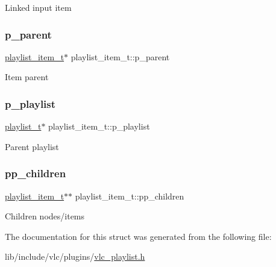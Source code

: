 Linked input item \mbox{\label{structplaylist__item__t_a4c5183597d06e0467dbf3526a6777a9a}} 
\subsubsection{\texorpdfstring{p\+\_\+parent}{p\_parent}}
{\footnotesize\ttfamily \hyperlink{structplaylist__item__t}{playlist\+\_\+item\+\_\+t}$\ast$ playlist\+\_\+item\+\_\+t\+::p\+\_\+parent}

Item parent \mbox{\label{structplaylist__item__t_a4723dfc8cd6ad6d775c56ffcb93174c2}} 
\subsubsection{\texorpdfstring{p\+\_\+playlist}{p\_playlist}}
{\footnotesize\ttfamily \hyperlink{structplaylist__t}{playlist\+\_\+t}$\ast$ playlist\+\_\+item\+\_\+t\+::p\+\_\+playlist}

Parent playlist \mbox{\label{structplaylist__item__t_a5ef0b5fca43e022ac56e00fd7a57a5e0}} 
\subsubsection{\texorpdfstring{pp\+\_\+children}{pp\_children}}
{\footnotesize\ttfamily \hyperlink{structplaylist__item__t}{playlist\+\_\+item\+\_\+t}$\ast$$\ast$ playlist\+\_\+item\+\_\+t\+::pp\+\_\+children}

Children nodes/items 

The documentation for this struct was generated from the following file\+:\begin{DoxyCompactItemize}
\item 
lib/include/vlc/plugins/\hyperlink{vlc__playlist_8h}{vlc\+\_\+playlist.\+h}\end{DoxyCompactItemize}
